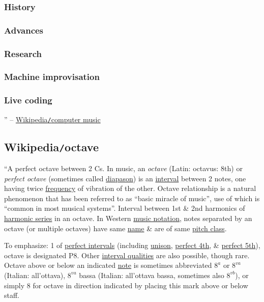 \documentclass{article}
\begin{document}
\subsubsection{History}

\subsubsection{Advances}

\subsubsection{Research}

\subsubsection{Machine improvisation}

\subsubsection{Live coding}

'' -- \href{https://en.wikipedia.org/wiki/Computer_music}{Wikipedia{\tt/}computer music}


\subsection{Wikipedia{\tt/}octave}
``{\sf A perfect octave between 2 Cs.} In music, an {\it octave} (Latin: octavus: 8th) or {\it perfect octave} (sometimes called \href{https://en.wikipedia.org/wiki/Pythagorean_interval}{diapason}) is an \href{https://en.wikipedia.org/wiki/Interval_(music)}{interval} between 2 notes, one having twice \href{https://en.wikipedia.org/wiki/Frequency}{frequency} of vibration of the other. Octave relationship is a natural phenomenon that has been referred to as ``basic miracle of music'', use of which is ``common in most musical systems''. Interval between 1st \& 2nd harmonics of \href{https://en.wikipedia.org/wiki/Harmonic_series_(music)}{harmonic series} in an octave. In Western \href{https://en.wikipedia.org/wiki/Musical_notation}{music notation}, notes separated by an octave (or multiple octaves) have same \href{https://en.wikipedia.org/wiki/Musical_note#Written_notes}{name} \& are of same \href{https://en.wikipedia.org/wiki/Pitch_class}{pitch class}.

To emphasize: 1 of \href{https://en.wikipedia.org/wiki/Interval_(music)#Perfect}{perfect intervals} (including \href{https://en.wikipedia.org/wiki/Unison}{unison}, \href{https://en.wikipedia.org/wiki/Perfect_fourth}{perfect 4th}, \& \href{https://en.wikipedia.org/wiki/Perfect_fifth}{perfect 5th}), octave is designated P8. Other \href{https://en.wikipedia.org/wiki/Interval_quality}{interval qualities} are also possible, though rare. Octave above or below an indicated \href{https://en.wikipedia.org/wiki/Musical_note}{note} is sometimes abbreviated $8^a$ or $8^{va}$ (Italian: all'ottava), $8^{va}$ bassa (Italian: all'ottava bassa, sometimes also $8^{vb}$), or simply 8 for octave in direction indicated by placing this mark above or below staff.
\end{document}
